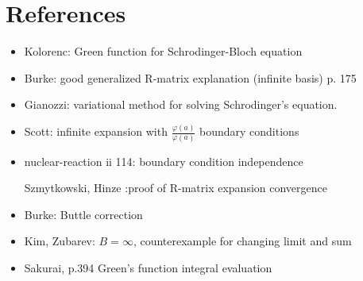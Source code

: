 \documentclass[12pt, a4paper]{article}
\begin{document}
\section{References}
\begin{itemize}
\item Kolorenc: Green function for Schrodinger-Bloch equation
\item Burke: good generalized R-matrix explanation (infinite basis) p. 175
\item Gianozzi: variational method for solving Schrodinger's equation.
\item Scott: infinite expansion with $\frac{\varphi(a)}{\varphi(a)}$ boundary conditions
\item nuclear-reaction ii 114: boundary condition independence
\item [Szmytkowski, Hinze] :proof of R-matrix expansion convergence
\item Burke: Buttle correction
\item Kim, Zubarev: $B = \infty$, counterexample for changing limit and sum
\item Sakurai, p.394 Green's function integral evaluation
\end{itemize}
\end{document}
